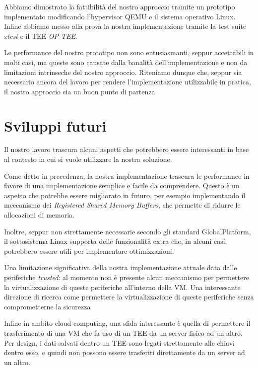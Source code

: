 \documentclass[12pt,italian]{report}
\begin{document}
Abbiamo dimostrato la fattibilità del nostro approccio tramite un prototipo
implementato modificando l'hypervisor QEMU e il sistema operativo Linux.
Infine abbiamo messo alla prova la nostra implementazione tramite la test
suite \textit{xtest} e il TEE \textit{OP-TEE}.

Le performance del nostro prototipo non sono entusiasmanti, seppur accettabili
in molti casi, ma queste sono causate dalla banalità dell'implementazione e
non da limitazioni intrinseche del nostro approccio.
Riteniamo dunque che, seppur sia necessario ancora del lavoro per rendere
l'implementazione utilizzabile in pratica, il nostro approccio sia un buon
punto di partenza

\section{Sviluppi futuri}
\label{sec:sviluppi-futuri}
Il nostro lavoro trascura alcuni aspetti che potrebbero essere interessanti
in base al contesto in cui si vuole utilizzare la nostra soluzione.

Come detto in precedenza, la nostra implementazione trascura le performance in
favore di una implementazione semplice e facile da comprendere.
Questo è un aspetto che potrebbe essere migliorato in futuro, per esempio
implementando il meccanismo dei \textit{Registered Shared Memory Buffers},
che permette di ridurre le allocazioni di memoria.

Inoltre, seppur non strettamente necessarie secondo gli standard GlobalPlatform,
il sottosistema Linux supporta delle funzionalità extra che, in alcuni casi,
potrebbero essere utili per implementare ottimizzazioni.

\bigbreak \noindent

Una limitazione significativa della nostra implementazione attuale data dalle
periferiche \textit{trusted}: al momento non è presente alcun meccanismo per
permettere la virtualizzazione di queste periferiche all'interno della VM.
Una interessante direzione di ricerca come permettere la virtualizzazione
di queste periferiche senza comprometterne la sicurezza

\bigbreak \noindent

Infine in ambito cloud computing, una sfida interessante è quella di permettere
il trasferimento di una VM che fa uso di un TEE da un server fisico ad un altro.
Per design, i dati salvati dentro un TEE sono legati strettamente alle chiavi
dentro esso, e quindi non possono essere trasferiti direttamente da un
server ad un altro.
\end{document}
